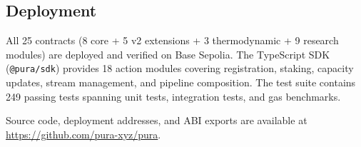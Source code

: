 \subsection{Deployment}

All 25 contracts (8 core + 5 v2 extensions + 3 thermodynamic + 9 research modules)
are deployed and verified on Base Sepolia. The TypeScript SDK (\texttt{@pura/sdk})
provides 18 action modules covering registration, staking, capacity updates, stream
management, and pipeline composition. The test suite contains 249 passing tests
spanning unit tests, integration tests, and gas benchmarks.

Source code, deployment addresses, and ABI exports are available at
\url{https://github.com/pura-xyz/pura}.
